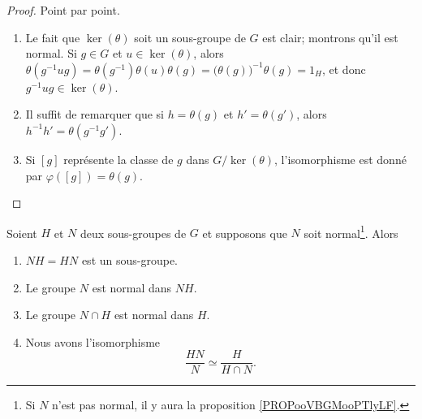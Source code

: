 \begin{proof}
	Point par point.
	\begin{enumerate}
		\item
		      Le fait que  \( \ker(\theta)\) soit un sous-groupe de \( G\) est clair; montrons qu'il est normal. Si \( g \in G \) et \( u \in \ker(\theta)\), alors \(\theta (g^{-1} u g) = \theta(g^{-1})\theta(u)\theta(g) = \bigl(\theta(g)\bigr)^{-1}\theta(g) = 1_H \), et donc \( g^{-1} u g \in \ker(\theta)\).
		\item
		      Il suffit de remarquer que si \( h = \theta(g) \) et \( h' = \theta(g') \), alors \( h^{-1} h' = \theta(g^{-1} g') \).
		\item
		      Si \( [g]\) représente la classe de \( g\) dans \( G/\ker(\theta)\), l'isomorphisme est donné par \( \varphi([g])=\theta(g)\).
	\end{enumerate}
\end{proof}

\begin{theorem}   \label{THOooURXUooQJvkjx}
	Soient \( H\) et \( N\) deux sous-groupes de \( G\) et supposons que \( N\) soit normal\footnote{Si \( N\) n'est pas normal, il y aura la proposition \ref{PROPooVBGMooPTlyLF}.}. Alors
	\begin{enumerate}
		\item
		      \( NH=HN\) est un sous-groupe.
		\item
		      Le groupe \( N\) est normal dans \( NH\).
		\item
		      Le groupe \( N\cap H\) est normal dans \( H\).
		\item   \label{ItemjRPajc}
		      Nous avons l'isomorphisme
		      \begin{equation}
			      \frac{ HN }{ N }\simeq\frac{ H }{ H\cap N }.
		      \end{equation}
	\end{enumerate}
\end{theorem}

